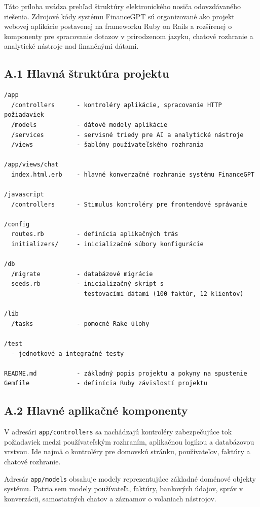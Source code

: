 Táto príloha uvádza prehľad štruktúry elektronického nosiča odovzdávaného
riešenia. Zdrojové kódy systému FinanceGPT sú organizované ako projekt webovej aplikácie
postavenej na frameworku Ruby on Rails a rozšírenej o komponenty pre spracovanie dotazov
v prirodzenom jazyku, chatové rozhranie a analytické nástroje nad finančnými
dátami.

\subsection*{A.1 Hlavná štruktúra projektu}

\begin{verbatim}
/app
  /controllers      - kontroléry aplikácie, spracovanie HTTP požiadaviek
  /models           - dátové modely aplikácie
  /services         - servisné triedy pre AI a analytické nástroje
  /views            - šablóny používateľského rozhrania

/app/views/chat
  index.html.erb    - hlavné konverzačné rozhranie systému FinanceGPT

/javascript
  /controllers      - Stimulus kontroléry pre frontendové správanie

/config
  routes.rb         - definícia aplikačných trás
  initializers/     - inicializačné súbory konfigurácie

/db
  /migrate          - databázové migrácie
  seeds.rb          - inicializačný skript s 
                      testovacími dátami (100 faktúr, 12 klientov)

/lib
  /tasks            - pomocné Rake úlohy

/test
  - jednotkové a integračné testy

README.md           - základný popis projektu a pokyny na spustenie
Gemfile             - definícia Ruby závislostí projektu
\end{verbatim}

\subsection*{A.2 Hlavné aplikačné komponenty}

V adresári \texttt{app/controllers} sa nachádzajú kontroléry zabezpečujúce tok
požiadaviek medzi používateľským rozhraním, aplikačnou logikou a databázovou vrstvou.
Ide najmä o kontroléry pre domovskú stránku, používateľov, faktúry a chatové
rozhranie.

Adresár \texttt{app/models} obsahuje modely reprezentujúce základné doménové objekty
systému. Patria sem modely používateľa, faktúry, bankových údajov, správ v konverzácii,
samostatných chatov a záznamov o volaniach nástrojov.

